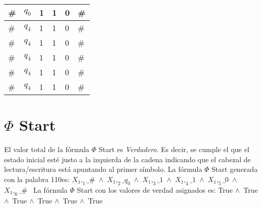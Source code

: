 ﻿\documentclass[a4paper,10pt]{article}
\begin{document}
\begin{table}[h]
\centering
\begin{tabular}{|l|l|l|l|l|l|}
\hline
	\#  &   $q_0$  &   1   &   1   &   0   &   \#	\\ \hline
	\#  &   $q_4$  &   1   &   1   &   0   &   \#	\\ \hline
	\#  &   $q_4$  &   1   &   1   &   0   &   \#	\\ \hline
	\#  &   $q_4$  &   1   &   1   &   0   &   \#	\\ \hline
	\#  &   $q_4$  &   1   &   1   &   0   &   \#	\\ \hline
	\#  &   $q_4$  &   1   &   1   &   0   &   \#	\\ \hline
\end{tabular}
\end{table}
\section{$\Phi$ Start}
El valor total de la fórmula $\Phi$ Start es \emph{Verdadero}. Es decir, se cumple el que el estado inicial esté justo a la izquierda de la cadena indicando que el cabezal de lectura/escritura está apuntando al primer símbolo. \newline \newline 
La fórmula $\Phi$ Start generada con la palabra 110es: \newline \newline 
$X_1,_1\_\#$\ $\wedge$\ $X_1,_2\_q_0$\ $\wedge$\ $X_1,_3\_1$\ $\wedge$\ $X_1,_4\_1$\ $\wedge$\ $X_1,_5\_0$\ $\wedge$\ $X_1,_6\_\#$\  \newline \newline 
La fórmula $\Phi$ Start con los valores de verdad asignados es: \newline \newline 
True $\wedge$\ True $\wedge$\ True $\wedge$\ True $\wedge$\ True $\wedge$\ True  \newline \newline 
\end{document}
